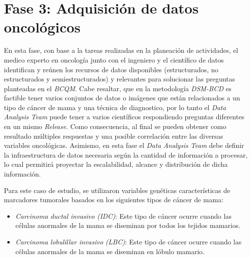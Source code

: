 \section{Fase 3: Adquisición de datos oncológicos}
En esta fase, con base a la tareas realizadas en la planeación de actividades, el medico experto en oncología junto con el ingeniero y el científico de datos identifican y reúnen los recursos de datos disponibles (estructurados, no estructurados y semiestructurados) y relevantes para solucionar las preguntas planteadas en el \textit{BCQM}. Cabe resaltar, que en la metodología \textit{\textit{DSM-BCD}} es factible tener varios conjuntos de datos o imágenes que están relacionados a un tipo de cáncer de mama y una técnica de diagnostico, por lo tanto  el \textit{Data Analysis Team} puede tener a varios científicos respondiendo preguntas diferentes en un mismo \textit{Release}. Como consecuencia, al final se pueden obtener como resultado múltiples respuestas y una posible correlación entre las diversas variables oncológicas.  Asimismo, en esta fase el \textit{Data Analysis Team} debe definir la infraestructura de datos necesaria según la cantidad de información a procesar, lo cual permitirá proyectar la escalabilidad, alcance y distribución de dicha información. 

Para este caso de estudio, se utilizaron variables genéticas características de marcadores tumorales  basados en los siguientes tipos de cáncer de mama:

\begin{itemize}
	\item \textit{Carcinoma ductal invasivo (IDC)}:  Este tipo de cáncer ocurre cuando las células anormales de la mama se diseminan por todos los tejidos mamarios.
	
	\item \textit{Carcinoma lobulillar invasivo (LBC)}: Este tipo de cáncer ocurre cuando las células anormales de la mama se diseminan en lóbulo mamario.
\end{itemize}

